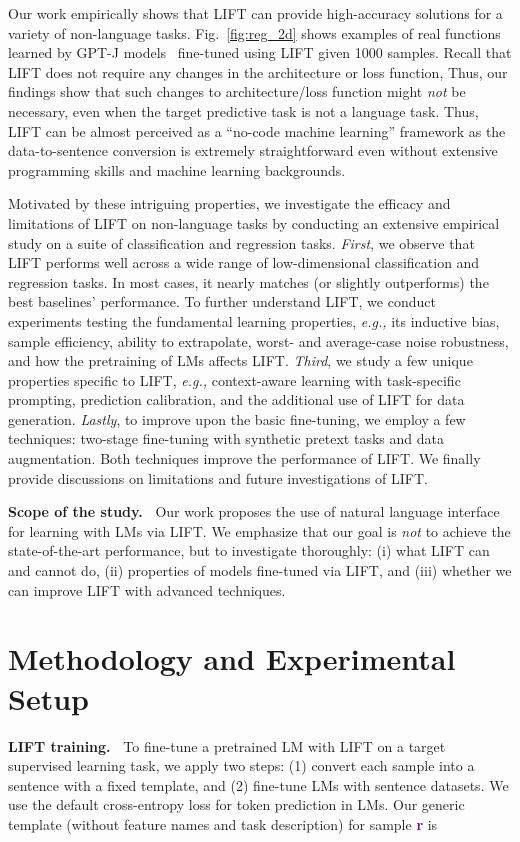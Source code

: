 Our work empirically shows that \textsc{LIFT} can provide high-accuracy solutions for a variety of non-language tasks. 
Fig.~\ref{fig:reg_2d} shows examples of real functions learned by GPT-J models~\citep{gpt-j} fine-tuned using \textsc{LIFT} given 1000 samples. Recall that \textsc{LIFT} does not require any changes in the architecture or loss function, Thus, our findings show that such changes to architecture/loss function might \emph{not} be necessary, even when the target predictive task is not a language task. Thus, \textsc{LIFT} can be almost perceived as a ``no-code machine learning'' framework as the data-to-sentence conversion is extremely straightforward even without extensive programming skills and machine learning backgrounds.

Motivated by these intriguing properties, we investigate the efficacy and limitations of \textsc{LIFT} on non-language tasks by conducting an extensive empirical study on a suite of classification and regression tasks.
\textit{First}, we observe that \textsc{LIFT} performs well across a wide range of low-dimensional classification and regression tasks. In most cases, it nearly matches (or slightly outperforms) the best baselines' performance. To further understand \textsc{LIFT}, we conduct experiments testing the fundamental learning properties, \textit{e.g.,} its inductive bias, sample efficiency, ability to extrapolate, worst- and average-case noise robustness, and how the pretraining of LMs affects \textsc{LIFT}.
\textit{Third}, we study a few unique properties specific to \textsc{LIFT}, \textit{e.g.,} 
context-aware learning with task-specific prompting, prediction calibration, and the additional use of \textsc{LIFT} for data generation.
\textit{Lastly}, to improve upon the basic fine-tuning, we employ a few techniques: two-stage fine-tuning with synthetic pretext tasks and data augmentation. Both techniques improve the performance of \textsc{LIFT}.
We finally provide discussions on limitations and future investigations of \textsc{LIFT}.

\textbf{Scope of the study.~} Our work proposes the use of natural language interface for learning with LMs via \textsc{LIFT}.
We emphasize that our goal is \emph{not} to achieve the state-of-the-art performance, but to investigate thoroughly: (i) what \textsc{LIFT} can and cannot do, (ii) properties of models fine-tuned via \textsc{LIFT}, and (iii) whether we can improve \textsc{LIFT} with advanced techniques.

\section{Methodology and Experimental Setup}\label{sec:methodology}
\textbf{\textsc{LIFT} training.~} To fine-tune a pretrained LM with \textsc{LIFT} on a target supervised learning task, we apply two steps: (1) convert each sample into a sentence with a fixed template, and (2) fine-tune LMs with sentence datasets. We use the default cross-entropy loss for token prediction in LMs. Our generic template (without feature names and task description) for sample \textcolor{purple}{\textbf{r}} is

